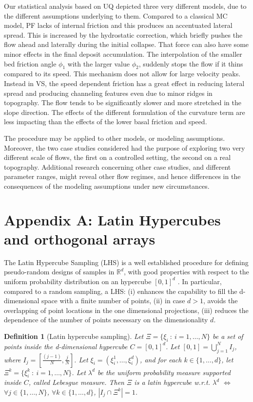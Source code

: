 \documentclass{article}
\newtheorem{definition}[theorem]{Definition}
\begin{document}
Our statistical analysis based on UQ depicted three very different models, due to the different assumptions underlying to them. Compared to a classical MC model, PF lacks of internal friction and this produces an accentuated lateral spread. This is increased by the hydrostatic correction, which briefly pushes the flow ahead and laterally during the initial collapse. That force can also have some minor effects in the final deposit accumulation. The interpolation of the smaller bed friction angle $\phi_1$ with the larger value $\phi_2$, suddenly stops the flow if it thins compared to its speed. This mechanism does not allow for large velocity peaks. Instead in VS, the speed dependent friction has a great effect in reducing lateral spread and producing channeling features even due to minor ridges in topography. The flow tends to be significantly slower and more stretched in the slope direction. The effects of the different formulation of the curvature term are less impacting than the effects of the lower basal friction and speed.

The procedure may be applied to other models, or modeling assumptions. Moreover, the two case studies considered had the purpose of exploring two very different scale of flows, the first on a controlled setting, the second on a real topography. Additional research concerning other case studies, and different parameter ranges, might reveal other flow regimes, and hence differences in the consequences of the modeling assumptions under new circumstances.


\section{Appendix A: Latin Hypercubes and orthogonal arrays}
The Latin Hypercube Sampling (LHS) is a well established procedure for defining pseudo-random designs of samples in $\mathbb R^d$, with good properties with respect to the uniform probability distribution on an hypercube $[0,1]^d$ \citep{McKay1979,Owen1992b,Stein1987,Ranjan2014,Mingyao2016}. In particular, compared to a random sampling, a LHS: (i) enhances the capability to fill the d-dimensional space with a finite number of points, (ii) in case $d>1$, avoids the overlapping of point locations in the one dimensional projections, (iii) reduces the dependence of the number of points necessary on the dimensionality $d$.

\begin{definition}[Latin hypercube sampling]
Let $\Xi=\{\xi_i\ :\ i=1,\dots,N\}$ be a set of points inside the d-dimensional hypercube $C=[0,1]^d$. Let $[0,1]=\bigcup_{j=1}^{N} I_j$, where $I_j=[\frac{(j-1)}{N},\frac{j}{N}]$. Let $\xi_i=\left(\xi_i^1,\dots,\xi_i^d\right)$, and for each $k\in\{1,\dots,d\}$, let $\Xi^k=\{\xi^k_i\ :\ i=1,\dots,N\}$. Let $\lambda^d$ be the uniform probability measure supported inside $C$, called Lebesgue measure. Then $\Xi$ is a latin hypercube w.r.t. $\lambda^d$ $\Longleftrightarrow$ $\forall j\in \{1,\dots,N\}$, $\forall k\in\{1,\dots,d\}$, $\left|I_j\cap\Xi^k\right|=1$.
\end{definition}
\end{document}
